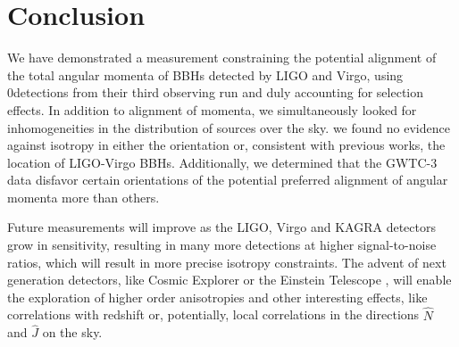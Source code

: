 \documentclass[twocolumn,twocolappendix,linenumbers]{aastex631}
\newcommand{\Nevents}{0}
\begin{document}
\section{Conclusion}
\label{sec:conclusion}

We have demonstrated a measurement constraining the potential alignment of the total angular momenta of \acp{BBH} detected by LIGO and Virgo, using \Nevents detections from their third observing run and duly accounting for selection effects.
In addition to alignment of momenta, we simultaneously looked for inhomogeneities in the distribution of sources over the sky.
 we found no evidence against isotropy in either the orientation or, consistent with previous works, the location of LIGO-Virgo \acp{BBH}.
Additionally, we determined that the GWTC-3 data disfavor certain orientations of the potential preferred alignment of angular momenta more than others.

Future measurements will improve as the LIGO, Virgo and KAGRA detectors grow in sensitivity, resulting in many more detections at higher signal-to-noise ratios, which will result in more precise isotropy constraints.
The advent of next generation detectors, like Cosmic Explorer \citep{Dwyer:2014fpa,Evans:2016mbw,Reitze:2019iox} or the Einstein Telescope \citep{Punturo:2010zz}, will enable the exploration of higher order anisotropies and other interesting effects, like correlations with redshift or, potentially, local correlations in the directions $\hat{N}$ and $\hat{J}$ on the sky.
\end{document}

